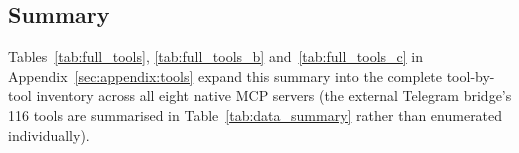 \subsection{Summary}\label{sec:data:summary}



Tables~\ref{tab:full_tools}, \ref{tab:full_tools_b} and~\ref{tab:full_tools_c} in Appendix~\ref{sec:appendix:tools} expand this summary into the complete tool-by-tool inventory across all eight native MCP servers (the external Telegram bridge's 116 tools are summarised in Table~\ref{tab:data_summary} rather than enumerated individually).
